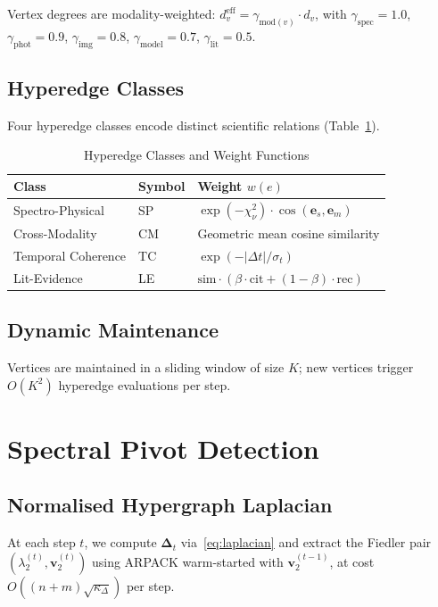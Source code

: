 \documentclass[conference]{IEEEtran}
\newcommand{\lam}{\lambda_2}
\newcommand{\Deltab}{\boldsymbol{\Delta}}
\newcommand{\vv}{\mathbf{v}}
\newcommand{\ee}{\mathbf{e}}
\begin{document}
Vertex degrees are modality-weighted:
$d_v^\mathrm{eff} = \gamma_{\mathrm{mod}(v)}\cdot d_v$,
with $\gamma_\mathrm{spec}=1.0$, $\gamma_\mathrm{phot}=0.9$,
$\gamma_\mathrm{img}=0.8$, $\gamma_\mathrm{model}=0.7$,
$\gamma_\mathrm{lit}=0.5$.

\subsection{Hyperedge Classes}

Four hyperedge classes encode distinct scientific relations
(Table~\ref{tab:edges}).

\begin{table}[htbp]
  \centering
  \caption{Hyperedge Classes and Weight Functions}
  \label{tab:edges}
  \small
  \begin{tabular}{llp{3.6cm}}
    \toprule
    \textbf{Class} & \textbf{Symbol} & \textbf{Weight $w(e)$} \\
    \midrule
    Spectro-Physical   & SP &
      $\exp(-\chi^2_\nu)\cdot\cos(\ee_s,\ee_m)$ \\
    Cross-Modality     & CM &
      Geometric mean cosine similarity \\
    Temporal Coherence & TC &
      $\exp(-|\Delta t|/\sigma_t)$ \\
    Lit-Evidence       & LE &
      $\mathrm{sim}\cdot(\beta\cdot\mathrm{cit}+(1{-}\beta)\cdot\mathrm{rec})$ \\
    \bottomrule
  \end{tabular}
\end{table}

\subsection{Dynamic Maintenance}
Vertices are maintained in a sliding window of size $K$; new vertices
trigger $O(K^2)$ hyperedge evaluations per step.

\section{Spectral Pivot Detection}\label{sec:pivot}

\subsection{Normalised Hypergraph Laplacian}
At each step $t$, we compute $\Deltab_t$ via~\eqref{eq:laplacian} and
extract the Fiedler pair $(\lam^{(t)}, \vv_2^{(t)})$ using
ARPACK warm-started with $\vv_2^{(t-1)}$, at cost
$O((n{+}m)\sqrt{\kappa_\Delta})$ per step.
\end{document}
